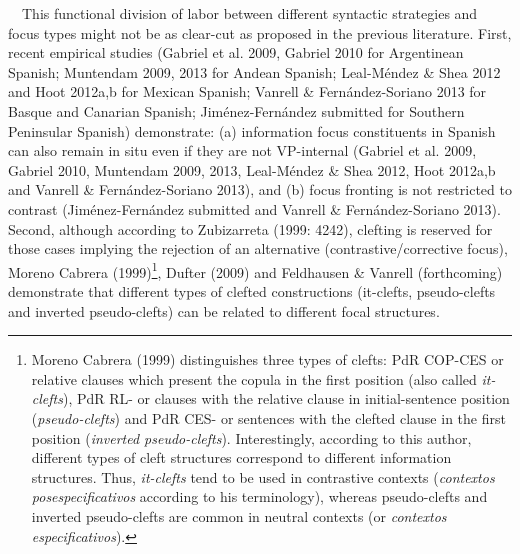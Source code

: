 \documentclass[11pt]{article}
\newenvironment{styleListParagraph}{\setlength\leftskip{0.5in}\setlength\rightskip{0in plus 1fil}\setlength\parindent{0in}\setlength\parfillskip{0pt plus 1fil}\setlength\parskip{0in plus 1pt}\writerlistparindent\writerlistleftskip\leavevmode\normalfont\normalsize\writerlistlabel\ignorespaces}{\unskip\vspace{0.139in plus 0.0139in}\par}
\newcommand\writerlistleftskip{}
\newcommand\writerlistparindent{}
\newcommand\writerlistlabel{}
\begin{document}
\begin{styleListParagraph}
\ \ This functional division of labor between different syntactic strategies and focus types might not be as clear-cut as proposed in the previous literature. First, recent empirical studies (Gabriel et al. 2009, Gabriel 2010 for Argentinean Spanish; Muntendam 2009, 2013 for Andean Spanish; Leal-Méndez \& Shea 2012 and Hoot 2012a,b for Mexican Spanish; Vanrell \& Fernández-Soriano 2013 for Basque and Canarian Spanish; Jiménez-Fernández submitted for Southern Peninsular Spanish) demonstrate: (a) information focus constituents in Spanish can also remain in situ even if they are not VP-internal (Gabriel et al. 2009, Gabriel 2010, Muntendam 2009, 2013, Leal-Méndez \& Shea 2012, Hoot 2012a,b and Vanrell \& Fernández-Soriano 2013), and (b) focus fronting is not restricted to contrast (Jiménez-Fernández submitted and Vanrell \& Fernández-Soriano 2013). Second, although according to Zubizarreta (1999: 4242), clefting is reserved for those cases implying the rejection of an alternative (contrastive/corrective focus), Moreno Cabrera (1999)\footnote{ Moreno Cabrera (1999) distinguishes three types of clefts: PdR COP-CES or relative clauses which present the copula in the first position (also called \textit{it-clefts}), PdR RL- or clauses with the relative clause in initial-sentence position (\textit{pseudo-clefts}) and PdR CES- or sentences with the clefted clause in the first position (\textit{inverted pseudo-clefts}). Interestingly, according to this author, different types of cleft structures correspond to different information structures. Thus, \textit{it-clefts} tend to be used in contrastive contexts (\textit{contextos posespecificativos} according to his terminology), whereas pseudo-clefts and inverted pseudo-clefts are common in neutral contexts (or \textit{contextos especificativos}).\par \par \par }, Dufter (2009) and Feldhausen \& Vanrell (forthcoming) demonstrate that different types of clefted constructions (it-clefts, pseudo-clefts and inverted pseudo-clefts) can be related to different focal structures.
\end{styleListParagraph}
\end{document}
